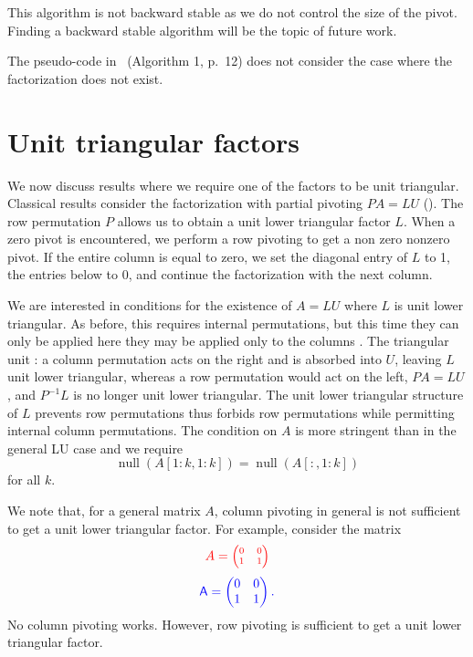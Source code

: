 \documentclass[10pt,twoside]{siamart1116}
\DeclareMathOperator{\nl}{null}
\numberwithin{theorem}{section}
\providecommand{\DIFadd}[1]{{\protect\color{blue} \sf #1}} %
\providecommand{\DIFdel}[1]{{\protect\color{red} \scriptsize #1}} %
\providecommand{\DIFaddbegin}{} %
\providecommand{\DIFaddend}{} %
\providecommand{\DIFdelbegin}{} %
\providecommand{\DIFdelend}{} %
\begin{document}
This algorithm is not backward stable as we do not control the size of the pivot. Finding a backward stable algorithm will be the topic of future work.

The pseudo-code in~\cite{okunev_necessary_2005} (Algorithm 1, p.~12) does not consider the case where the factorization does not exist.

\section{Unit triangular factors}\label{sec:unit_triangular}

We now discuss results where we require one of the factors to be unit triangular. Classical results consider the factorization with partial pivoting $PA = LU$ (). The row permutation $P$ allows us to obtain a unit lower triangular factor $L$. When a zero pivot is encountered, we perform a row pivoting to get a \DIFdelbegin \DIFdel{non zero }\DIFdelend \DIFaddbegin \DIFadd{nonzero }\DIFaddend pivot. If the entire column is equal to zero, we set the diagonal entry of $L$ to 1, the entries below to 0, and continue the factorization with the next column.

We are interested in conditions for the existence of $A=LU$ where $L$ is unit lower triangular. As before, this requires internal permutations, but \DIFdelbegin \DIFdel{this time they can only be applied }\DIFdelend \DIFaddbegin \DIFadd{here they may be applied only }\DIFaddend to the columns\DIFdelbegin \DIFdel{. The triangular unit }\DIFdelend \DIFaddbegin \DIFadd{: a column permutation acts on the right and is absorbed into $U$, leaving $L$ unit lower triangular, whereas a row permutation would act on the left, $PA=LU$, and $P^{-1}L$ is no longer unit lower triangular. The unit lower triangular }\DIFaddend structure of $L$ \DIFdelbegin \DIFdel{prevents row permutations }\DIFdelend \DIFaddbegin \DIFadd{thus forbids row permutations while permitting internal column permutations}\DIFaddend . The condition on $A$ is more stringent than in the general LU case and we require
\[
  \nl(A[1:k,1:k]) = \nl(A[:,1:k])
\]
for all $k$.

We note that, for a general matrix $A$, column pivoting in general is not sufficient to get a unit lower triangular factor. For example, consider the matrix
\DIFdelbegin \[
	\DIFdel{A = \begin{pmatrix}
		0 & 0 \\
		1 & 1
	\end{pmatrix}
}\]%
\DIFdelend \DIFaddbegin \[
  \DIFadd{A =
  \begin{pmatrix}
    0 & 0 \\
    1 & 1
  \end{pmatrix}.
}\]\DIFaddend 
No column pivoting works. However, row pivoting is sufficient to get a unit lower triangular factor.
\end{document}
